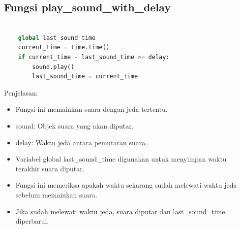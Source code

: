 \documentclass[11pt,a4paper]{article}
\begin{document}
    \subsection{Fungsi play\_sound\_with\_delay}
    \begin{lstlisting}[language=Python, caption=Fungsi memainkan suara dengan jeda]

    global last_sound_time
    current_time = time.time()
    if current_time - last_sound_time >= delay:
        sound.play()
        last_sound_time = current_time
    \end{lstlisting}
    Penjelasan:
    \begin{itemize}
        \item Fungsi ini memainkan suara dengan jeda tertentu.
        \item sound: Objek suara yang akan diputar.
        \item delay: Waktu jeda antara pemutaran suara.
        \item Variabel global last\_sound\_time digunakan untuk menyimpan waktu terakhir suara diputar.
        \item Fungsi ini memeriksa apakah waktu sekarang sudah melewati waktu jeda sebelum memainkan suara.
        \item Jika sudah melewati waktu jeda, suara diputar dan last\_sound\_time diperbarui.
    \end{itemize}
\end{document}
